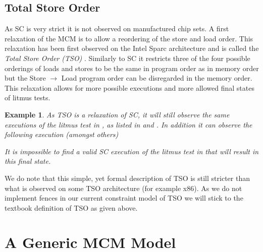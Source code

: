 \documentclass[runningheads]{llncs}
\newtheorem{exa}{Example}
\begin{document}
\subsection{Total Store Order}
\label{sec:tso}
As SC is very strict it is not observed on manufactured chip sets.
A first relaxation of the MCM is to allow a reordering of the store and load order.
This relaxation has been first observed on the Intel Sparc architecture and is called the \emph{Total Store Order (TSO)} \cite{sparc1994}.
Similarly to SC it restricts three of the four possible orderings of loads and stores to be the same in program order as in memory order but the Store $\rightarrow$ Load program order can be disregarded in the memory order.
This relaxation allows for more possible executions and more allowed final states of litmus tests.

\begin{exa}
\label{exa:tso}
As TSO is a relaxation of SC, it will still observe the same executions of the litmus test in , as listed in  and .
In addition it can observe the following execution (amongst others)
\begin{table}[H]
\begin{center}
{}
\end{center}
\end{table}
\vspace{-1cm}

It is impossible to find a valid SC execution of the litmus test in  that will result in this final state.
\end{exa}


We do note that this simple, yet formal description of TSO is still stricter than what is observed on some TSO architecture (for example x86).
As we do not implement fences in our current constraint model of TSO we will stick to the textbook definition of TSO as given above.


\section{A Generic MCM Model}
\end{document}
